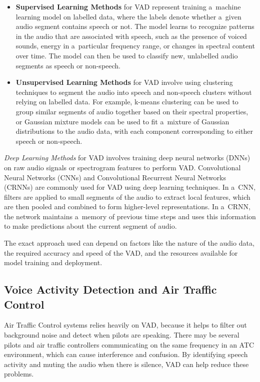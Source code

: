 \begin{itemize}
    \item \textbf{Supervised Learning Methods} for VAD represent training a~machine learning model on labelled data, where the labels denote whether a~given audio segment contains speech or not. The model learns to recognize patterns in the audio that are associated with speech, such as the presence of voiced sounds, energy in a~particular frequency range, or changes in spectral content over time. The model can then be used to classify new, unlabelled audio segments as speech or non-speech.

    \item \textbf{Unsupervised Learning Methods} for VAD involve using clustering techniques to segment the audio into speech and non-speech clusters without relying on labelled data. For example, k-means clustering can be used to group similar segments of audio together based on their spectral properties, or Gaussian mixture models can be used to fit a~mixture of Gaussian distributions to the audio data, with each component corresponding to either speech or non-speech.
\end{itemize}

    \textit{Deep Learning Methods} for VAD involves training deep neural networks (DNNs) on raw audio signals or spectrogram features to perform VAD. Convolutional Neural Networks (CNNs) and Convolutional Recurrent Neural Networks (CRNNs) are commonly used for VAD using deep learning techniques. In a~CNN, filters are applied to small segments of the audio to extract local features, which are then pooled and combined to form higher-level representations. In a~CRNN, the network maintains a~memory of previous time steps and uses this information to make predictions about the current segment of audio.

The exact approach used can depend on factors like the nature of the audio data, the required accuracy and speed of the VAD, and the resources available for model training and deployment.

\subsection{Voice Activity Detection and Air Traffic Control}\label{VADinATC}

Air Traffic Control systems relies heavily on VAD, because it helps to filter out background noise and detect when pilots are speaking. There may be several pilots and air traffic controllers communicating on the same frequency in an ATC environment, which can cause interference and confusion. By identifying speech activity and muting the audio when there is silence, VAD can help reduce these problems.

